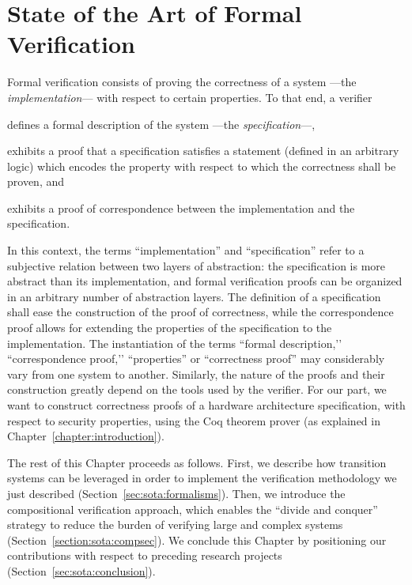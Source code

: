 \chapter{State of the Art of Formal Verification}
\label{chapter:relatedwork}


\vspace{1cm}\noindent
%
Formal verification consists of proving the correctness of a system ---the
\emph{implementation}--- with respect to certain properties.
%
To that end, a verifier
%
\begin{inparaenum}[(1)]
\item defines a formal description of the system ---the \emph{specification}---,
\item exhibits a proof that a specification satisfies a statement (defined in an
  arbitrary logic) which encodes the property with respect to which the
  correctness shall be proven, and
\item exhibits a proof of correspondence between the implementation and the
  specification.
\end{inparaenum}
%
In this context, the terms ``implementation'' and ``specification'' refer to a
subjective relation between two layers of abstraction: the specification is more
abstract than its implementation, and formal verification proofs can be
organized in an arbitrary number of abstraction layers.
%
The definition of a specification shall ease the construction of the proof of
correctness, while the correspondence proof allows for extending the properties
of the specification to the implementation.
%
The instantiation of the terms ``formal description,’’ ``correspondence proof,’’
``properties'' or ``correctness proof'' may considerably vary from one system to
another.
%
Similarly, the nature of the proofs and their construction greatly depend on the
tools used by the verifier.
%
For our part, we want to construct correctness proofs of a hardware architecture
specification, with respect to security properties, using the Coq theorem prover
(as explained in Chapter~\ref{chapter:introduction}).

The rest of this Chapter proceeds as follows.
%
First, we describe how transition systems can be leveraged in order to implement
the verification methodology we just described
(Section~\ref{sec:sota:formalisms}).
%
Then, we introduce the compositional verification approach, which enables the
``divide and conquer'' strategy to reduce the burden of verifying large and
complex systems (Section~\ref{section:sota:compsec}).
%
We conclude this Chapter by positioning our contributions with respect to
preceding research projects (Section~\ref{sec:sota:conclusion}).

